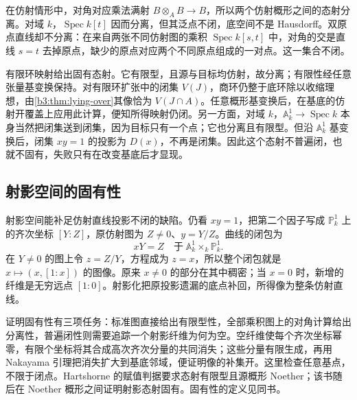 在仿射情形中，对角对应乘法满射 \(B\otimes_AB\rightarrow B\)，所以两个仿射概形之间的态射分离。对域 \(k\)，\(\operatorname{Spec}k[t]\) 因而分离，但其泛点不闭，底空间不是 Hausdorff。双原点直线却不分离：在来自两张不同仿射图的乘积 \(\operatorname{Spec}k[s,t]\) 中，对角的交是直线 \(s=t\) 去掉原点，缺少的原点对应两个不同原点组成的一对点。这一集合不闭。

\ProseParagraphBreak
有限环映射给出固有态射。它有限型，且源与目标均仿射，故分离；有限性经任意张量基变换保持。对有限环扩张中的闭集 \(V(J)\)，商环仍整于底环除以收缩理想，由\cref{b3:thm:lying-over}其像恰为 \(V(J\cap A)\)。任意概形基变换后，在基底的仿射开覆盖上应用此计算，便知所得映射仍闭。另一方面，对域 \(k\)，\(\mathbb A_k^1\rightarrow\operatorname{Spec}k\) 本身当然把闭集送到闭集，因为目标只有一个点；它也分离且有限型。但沿 \(\mathbb A_k^1\) 基变换后，闭集 \(xy=1\) 的投影为 \(D(x)\)，不再是闭集。因此这个态射不普遍闭，也就不固有，失败只有在改变基底后才显现。

\subsection{射影空间的固有性}
\label{b3:subsec:2404:projective-properness}

射影空间能补足仿射直线投影不闭的缺陷。仍看 \(xy=1\)，把第二个因子写成 \(\mathbb P_k^1\) 上的齐次坐标 \([Y:Z]\)，原仿射图为 \(Z\ne0\)、\(y=Y/Z\)。曲线的闭包为
\[
	xY=Z\quad\text{于}\;\mathbb A_k^1\times_k\mathbb P_k^1.
\]
在 \(Y\ne0\) 的图上令 \(z=Z/Y\)，方程成为 \(z=x\)，所以整个闭包就是 \(x\mapsto(x,[1:x])\) 的图像。原来 \(x\ne0\) 的部分在其中稠密；当 \(x=0\) 时，新增的纤维是无穷远点 \([1:0]\)。射影化把原投影遗漏的底点补回，所得像为整条仿射直线。

\ProseParagraphBreak
证明固有性有三项任务：标准图直接给出有限型性，全部乘积图上的对角计算给出分离性，普遍闭性则需要追踪一个射影纤维为何为空。空纤维使每个齐次坐标幂零，有限个坐标将其合成高次齐次分量的共同消失；这些分量有限生成，再用 Nakayama 引理把消失扩大到基底邻域，便证明像的补集开。这里检查任意基点，不限于闭点。Hartshorne 的赋值判据要求态射有限型且源概形 Noether；该书随后在 Noether 概形之间证明射影态射固有\cite[Chapter II, Theorems 4.7 and 4.9, pp. 101--104]{Hartshorne1977}。固有性的定义见同书\cite[Chapter II, p. 100]{Hartshorne1977}。

